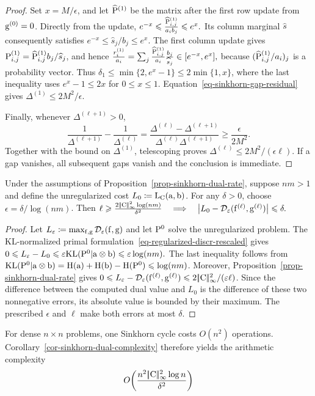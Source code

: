 \begin{proof}
Set $x=M/\epsilon$, and let $\widehat\P^{(1)}$ be the matrix after the first row update from $\gD^{(0)}=0$. Directly from the update, \(e^{-x} \leq \frac{\widehat{\P}^{(1)}_{i,j}}{a_i b_j} \leq e^x.\)
Its column marginal $\widehat s$ consequently satisfies $e^{-x}\leq \widehat s_j/b_j\leq e^x$. The first column update gives $\P^{(1)}_{i,j}=\widehat{\P}^{(1)}_{i,j}b_j/\widehat s_j$, and hence
\(\frac{r_i^{(1)}}{a_i} = \sum_j\frac{\widehat{\P}^{(1)}_{i,j}}{a_i}\frac{b_j}{\widehat s_j} \in[e^{-x},e^x],\)
because $(\widehat{\P}^{(1)}_{i,j}/a_i)_j$ is a probability vector. Thus $\delta_1\leq\min\{2,e^x-1\}\leq2\min\{1,x\}$, where the last inequality uses $e^x-1\leq2x$ for $0\leq x\leq1$. Equation~\eqref{eq-sinkhorn-gap-residual} gives $\Delta^{(1)}\leq2M^2/\epsilon$.

Finally, whenever $\Delta^{(\ell+1)}>0$,
\[
\frac1{\Delta^{(\ell+1)}}-\frac1{\Delta^{(\ell)}}
=
\frac{\Delta^{(\ell)}-\Delta^{(\ell+1)}}{\Delta^{(\ell)}\Delta^{(\ell+1)}}
\geq
\frac{\epsilon}{2M^2}.
\]
Together with the bound on $\Delta^{(1)}$, telescoping proves $\Delta^{(\ell)}\leq2M^2/(\epsilon\ell)$. If a gap vanishes, all subsequent gaps vanish and the conclusion is immediate.
\end{proof}
\begin{cor}\label{cor-sinkhorn-dual-complexity}
Under the assumptions of Proposition~\ref{prop-sinkhorn-dual-rate}, suppose $nm>1$ and define the unregularized cost $L_0\eqdef\MKD_\C(\a,\b)$. For any $\delta>0$, choose $\epsilon=\delta/\log(nm)$. Then
\(\ell\geq \frac{2\norm{\C}_\infty^2\log(nm)}{\delta^2} \quad\Longrightarrow\quad \abs{L_0-\Dd_\epsilon(\fD^{(\ell)},\gD^{(\ell)})}\leq\delta.\)
\end{cor}
\begin{proof}
Let $L_\epsilon\eqdef\max_{\fD,\gD}\Dd_\epsilon(\fD,\gD)$ and let $\P^0$ solve the unregularized problem. The KL-normalized primal formulation~\eqref{eq-regularized-discr-rescaled} gives
\(0\leq L_\epsilon-L_0 \leq \epsilon\KLD(\P^0|\a\otimes\b) \leq \epsilon\log(nm).\)
The last inequality follows from $\KLD(\P^0|\a\otimes\b)=\HD(\a)+\HD(\b)-\HD(\P^0)\leq\log(nm)$.
Moreover, Proposition~\ref{prop-sinkhorn-dual-rate} gives $0\leq L_\epsilon-\Dd_\epsilon(\fD^{(\ell)},\gD^{(\ell)})\leq2\norm{\C}_\infty^2/(\epsilon\ell)$. Since the difference between the computed dual value and $L_0$ is the difference of these two nonnegative errors, its absolute value is bounded by their maximum. The prescribed $\epsilon$ and $\ell$ make both errors at most $\delta$.
\end{proof}
For dense $n\times n$ problems, one Sinkhorn cycle costs $O(n^2)$ operations. Corollary~\ref{cor-sinkhorn-dual-complexity} therefore yields the arithmetic complexity
\[
O\!\left(\frac{n^2\norm{\C}_\infty^2\log n}{\delta^2}\right)
\]
